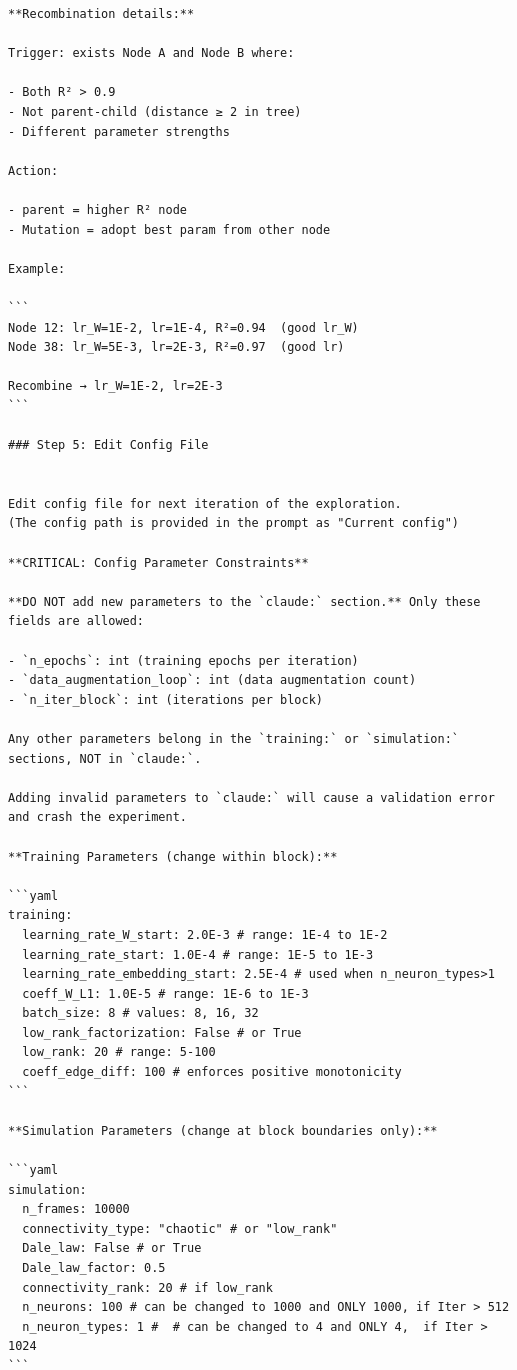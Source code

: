 \documentclass[10pt,twocolumn]{article}
\begin{document}
\begin{small}
\begin{verbatim}
**Recombination details:**

Trigger: exists Node A and Node B where:

- Both R² > 0.9
- Not parent-child (distance ≥ 2 in tree)
- Different parameter strengths

Action:

- parent = higher R² node
- Mutation = adopt best param from other node

Example:

```
Node 12: lr_W=1E-2, lr=1E-4, R²=0.94  (good lr_W)
Node 38: lr_W=5E-3, lr=2E-3, R²=0.97  (good lr)

Recombine → lr_W=1E-2, lr=2E-3
```

### Step 5: Edit Config File


Edit config file for next iteration of the exploration.
(The config path is provided in the prompt as "Current config")

**CRITICAL: Config Parameter Constraints**

**DO NOT add new parameters to the `claude:` section.** Only these fields are allowed:

- `n_epochs`: int (training epochs per iteration)
- `data_augmentation_loop`: int (data augmentation count)
- `n_iter_block`: int (iterations per block)

Any other parameters belong in the `training:` or `simulation:` sections, NOT in `claude:`.

Adding invalid parameters to `claude:` will cause a validation error and crash the experiment.

**Training Parameters (change within block):**

```yaml
training:
  learning_rate_W_start: 2.0E-3 # range: 1E-4 to 1E-2
  learning_rate_start: 1.0E-4 # range: 1E-5 to 1E-3
  learning_rate_embedding_start: 2.5E-4 # used when n_neuron_types>1
  coeff_W_L1: 1.0E-5 # range: 1E-6 to 1E-3
  batch_size: 8 # values: 8, 16, 32
  low_rank_factorization: False # or True
  low_rank: 20 # range: 5-100
  coeff_edge_diff: 100 # enforces positive monotonicity
```

**Simulation Parameters (change at block boundaries only):**

```yaml
simulation:
  n_frames: 10000
  connectivity_type: "chaotic" # or "low_rank"
  Dale_law: False # or True
  Dale_law_factor: 0.5
  connectivity_rank: 20 # if low_rank
  n_neurons: 100 # can be changed to 1000 and ONLY 1000, if Iter > 512
  n_neuron_types: 1 #  # can be changed to 4 and ONLY 4,  if Iter > 1024
```


\end{verbatim}
\end{small}
\end{document}
